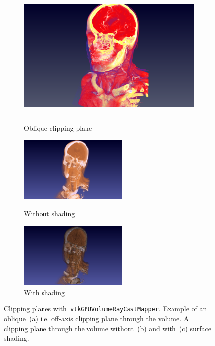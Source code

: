 \begin{figure}[htb]
  \centering
  \begin{subfigure}[b]{.55\columnwidth}
    \includegraphics[width=\textwidth, height=7cm]{HeadClippingOblique}
    \caption{Oblique clipping plane}
    \label{fig:clipoblique}
  \end{subfigure}%
  \hspace*{\fill}
  \begin{subfigure}[b]{.43\columnwidth}
    \includegraphics[width=\textwidth, height=3.19cm]{HeadClippingSlabNoShading}
    \caption{Without shading}
    \label{fig:clipnoshading}
    \includegraphics[width=\textwidth, height=3.19cm]{HeadClippingSlabShading}
    \caption{With shading}
    \label{fig:clipshading}
  \end{subfigure}

  \caption{Clipping planes with~\texttt{vtkGPUVolumeRayCastMapper}. Example of
    an oblique~(a) i.e. off-axis clipping plane through the volume.
    A clipping plane through the volume without~(b) and with~(c)
    surface shading.}
  \label{fig:clipping}
\end{figure}

